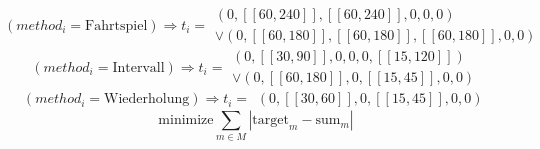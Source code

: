 \begin{equation}
    (method_i = \text{Fahrtspiel})\Rightarrow t_i = \begin{array}{c}
            (0, [\![60, 240]\!], [\![60, 240]\!], 0, 0, 0) \\ 
        \vee (0, [\![60,180]\!], [\![60, 180]\!], [\![60, 180]\!], 0, 0)
    \end{array}
\end{equation}
\begin{equation}
    (method_i = \text{Intervall})\Rightarrow t_i = \begin{array}{c}
            (0, [\![30, 90]\!], 0, 0, 0, [\![15, 120]\!]) \\ 
        \vee (0, [\![60,180]\!], 0, [\![15, 45]\!], 0, 0)
    \end{array}
\end{equation}
\begin{equation}
    (method_i = \text{Wiederholung})\Rightarrow t_i = \begin{array}{c}
            (0, [\![30, 60]\!], 0, [\![15, 45]\!], 0, 0)
    \end{array}
\end{equation}
\begin{equation}
    \text{minimize} \sum_{m\in M} |\text{target}_m - \text{sum}_m|
\end{equation} 
